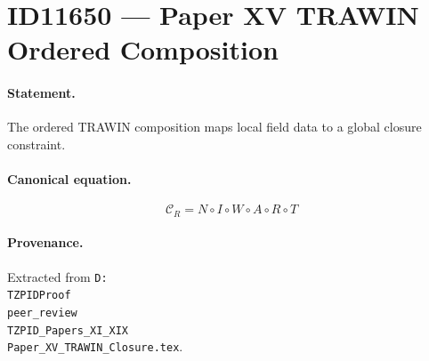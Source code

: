 \section*{ID11650 --- Paper XV TRAWIN Ordered Composition}

\paragraph{Statement.}
The ordered TRAWIN composition maps local field data to a global closure constraint.

\paragraph{Canonical equation.}
\[
\mathcal{C}_R=N\circ I\circ W\circ A\circ R\circ T
\]

\paragraph{Provenance.}
Extracted from \texttt{D:\\TZPIDProof\\peer\_review\\TZPID\_Papers\_XI\_XIX\\Paper\_XV\_TRAWIN\_Closure.tex}.
